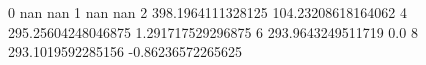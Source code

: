 0 nan nan
1 nan nan
2 398.1964111328125 104.23208618164062
4 295.25604248046875 1.291717529296875
6 293.9643249511719 0.0
8 293.1019592285156 -0.86236572265625
